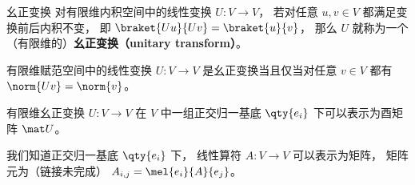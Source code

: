 
\begin{issues}
\issueDraft
\end{issues}


\begin{definition}{幺正变换}
对有限维内积空间中的线性变换 $U: V\to V$， 若对任意 $u, v \in V$ 都满足变换前后内积不变， 即 $\braket{Uu}{Uv} = \braket{u}{v}$， 那么 $U$ 就称为一个（有限维的）\textbf{幺正变换（unitary transform）}。
\end{definition}

\begin{theorem}{}
有限维赋范空间中的线性变换 $U: V\to V$ 是幺正变换当且仅当对任意 $v\in V$ 都有 $\norm{Uv} = \norm{v}$。
\end{theorem}

\begin{theorem}{}
有限维幺正变换 $U: V\to V$ 在 $V$ 中一组正交归一基底 $\qty{e_i}$ 下可以表示为酉矩阵 $\mat U$。
\end{theorem}
我们知道正交归一基底 $\qty{e_i}$ 下， 线性算符 $A:V\to V$ 可以表示为矩阵， 矩阵元为（链接未完成） $A_{i,j} = \mel{e_i}{A}{e_j}$。
